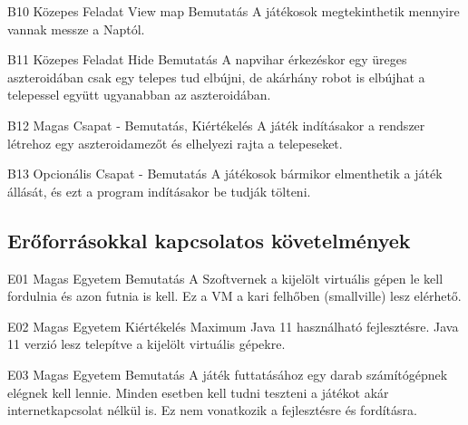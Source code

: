 \documentclass[../../projlab]{subfiles}
\begin{document}
\begin{funkovetelmeny}
	{B10}
	{Közepes}
	{Feladat}
	{View map}
	{Bemutatás}
	{A játékosok megtekinthetik mennyire vannak messze a Naptól.}
    
\end{funkovetelmeny}

\begin{funkovetelmeny}
	{B11}
	{Közepes}
	{Feladat}
	{Hide}
	{Bemutatás}
	{A napvihar érkezéskor egy üreges aszteroidában csak egy telepes tud elbújni, de akárhány robot is elbújhat a telepessel együtt ugyanabban az aszteroidában.}
    
\end{funkovetelmeny}


\begin{funkovetelmeny}
	{B12}
	{Magas}
	{Csapat}
	{-}
	{Bemutatás, Kiértékelés}
	{A játék indításakor a rendszer létrehoz egy aszteroidamezőt és elhelyezi rajta a telepeseket.}
\end{funkovetelmeny}

\begin{funkovetelmeny}
	{B13}
	{Opcionális}
	{Csapat}
	{-}
	{Bemutatás}
	{A játékosok bármikor elmenthetik a játék állását, és ezt a program indításakor be tudják tölteni.}
\end{funkovetelmeny}

\subsection{Erőforrásokkal kapcsolatos követelmények}

\begin{kovetelmeny}
	{E01} %
	{Magas} %
	{Egyetem} %
	{Bemutatás} %
	{A Szoftvernek a kijelölt virtuális gépen le kell fordulnia és azon futnia is kell.} %
    Ez a VM a kari felhőben (smallville) lesz elérhető.
\end{kovetelmeny}

\begin{kovetelmeny}
	{E02} %
	{Magas} %
	{Egyetem} %
	{Kiértékelés} %
	{Maximum Java 11 használható fejlesztésre.} %
    Java 11 verzió lesz telepítve a kijelölt virtuális gépekre.
\end{kovetelmeny}

\begin{kovetelmeny}
	{E03} %
	{Magas} %
	{Egyetem} %
	{Bemutatás} %
	{A játék futtatásához egy darab számítógépnek elégnek kell lennie.} %
    Minden esetben kell tudni teszteni a játékot akár internetkapcsolat nélkül is. Ez nem vonatkozik a fejlesztésre és fordításra.
\end{kovetelmeny}
\end{document}
